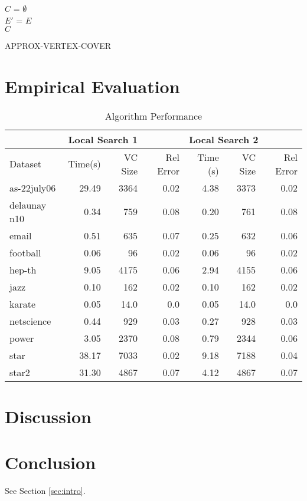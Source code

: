 \documentclass[sigconf]{acmart}
\begin{document}
\begin{algorithm}[h]
	\SetAlgoNoLine
	$C$ = $\emptyset$\\
	$E'$ = $E$\\
	\Return $C$
	
	\caption{APPROX-VERTEX-COVER}
	\label{alg:avc}
\end{algorithm}

\section{Empirical Evaluation}

\begin{table}[h]
	\caption{Algorithm Performance}
	\label{algperf}
	\begin{tabular}{lrrrrrr}
		\toprule
		& \multicolumn{3}{l}{Local Search 1} & \multicolumn{3}{l}{Local Search 2} \\ \midrule
		Dataset & Time(s)    & VC Size   & Rel Error  & Time (s)   & VC Size   & Rel Error  \\ \midrule
		as-22july06    & 29.49   & 3364      & 0.02   & 4.38   & 3373      & 0.02   \\
		delaunay n10    & 0.34   & 759      & 0.08   & 0.20   & 761      & 0.08   \\
		email    & 0.51   & 635      & 0.07   & 0.25   & 632      & 0.06   \\
		football    & 0.06   & 96      & 0.02   & 0.06   & 96      & 0.02   \\
		hep-th    & 9.05   & 4175      & 0.06   & 2.94   & 4155      & 0.06   \\
		jazz    & 0.10   & 162      & 0.02   & 0.10   & 162      & 0.02   \\
		karate    & 0.05   & 14.0      & 0.0   & 0.05   & 14.0      & 0.0   \\
		netscience    & 0.44   & 929      & 0.03   & 0.27   & 928      & 0.03   \\
		power    & 3.05   & 2370      & 0.08   & 0.79   & 2344      & 0.06   \\
		star    & 38.17   & 7033      & 0.02   & 9.18   & 7188      & 0.04   \\
		star2    & 31.30   & 4867      & 0.07   & 4.12   & 4867      & 0.07   \\
		\bottomrule
	\end{tabular}
\end{table}

\section{Discussion}

\section{Conclusion}
See Section \ref{sec:intro}.


 
\end{document}
